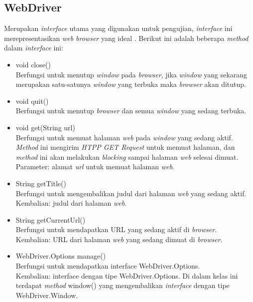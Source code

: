 \subsection{WebDriver}
\label{subsec:webdriver}
Merupakan \textit{interface} utama yang digunakan untuk pengujian, \textit{interface} ini merepresentasikan \textit{web browser} yang ideal . Berikut ini adalah beberapa \textit{method} dalam \textit{interface} ini:
\begin{itemize}
\item void close()\\
Berfungsi untuk menutup \textit{window} pada \textit{browser}, jika \textit{window} yang sekarang merupakan satu-satunya \textit{window} yang terbuka maka \textit{browser} akan ditutup.
\item void quit()\\
Berfungsi untuk menutup \textit{browser} dan semua \textit{window} yang sedang terbuka.
\item void get(String url)\\
Berfungsi untuk memuat halaman \textit{web} pada \textit{window} yang sedang aktif. \textit{Method} ini mengirim \textit{HTPP GET Request} untuk memuat halaman, dan \textit{method} ini akan melakukan \textit{blocking} sampai halaman \textit{web} selesai dimuat.\\
Parameter: alamat \textit{url} untuk memuat halaman \textit{web}.
\item String getTitle()\\
Berfungsi untuk mengembalikan judul dari halaman \textit{web} yang sedang aktif.\\
Kembalian: judul dari halaman \textit{web}.
\item String getCurrentUrl()\\
Berfungsi untuk mendapatkan URL yang sedang aktif di \textit{browser}.\\
Kembalian: URL dari halaman \textit{web} yang sedang dimuat di \textit{browser}.

\item WebDriver.Options manage()\\
Berfungsi untuk mendapatkan interface WebDriver.Options.\\
Kembalian: interface dengan tipe WebDriver.Options. Di dalam kelas ini terdapat \textit{method} window() yang mengembalikan \textit{interface} dengan tipe WebDriver.Window. 
\end{itemize}

